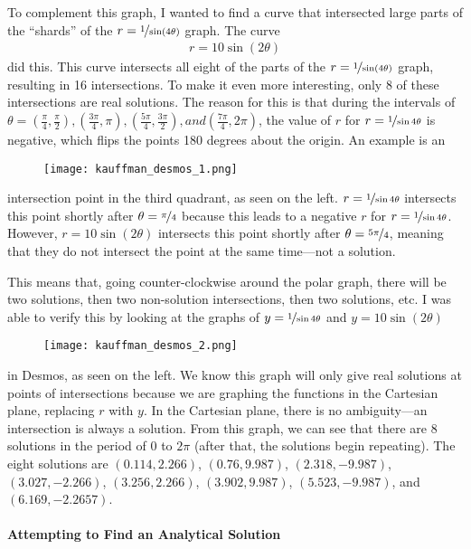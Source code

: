 To complement this graph, I wanted to find a curve that intersected large parts of the ``shards'' of the $r = \nicefrac{1}{\sin(4\theta)}$ graph. The curve
\begin{align*}
    r = 10\sin(2\theta)
\end{align*}
did this. This curve intersects all eight of the parts of the $r = \nicefrac{1}{\sin(4\theta)}$ graph, resulting in 16 intersections. To make it even more interesting, only 8 of these intersections are real solutions. The reason for this is that during the intervals of $\theta = (\frac{\pi}{4}, \frac{\pi}{2}), (\frac{3\pi}{4}, \pi), (\frac{5\pi}{4}, \frac{3\pi}{2}), and (\frac{7\pi}{4}, 2\pi)$, the value of $r$ for $r = \nicefrac{1}{\sin{4\theta}}$ is negative, which flips the points 180 degrees about the origin. An example is an \begin{wrapfigure}{l}{0.55\textwidth}
    \centering
    \texttt{[image: kauffman\_desmos\_1.png]}
\end{wrapfigure} intersection point in the third quadrant, as seen on the left. $r = \nicefrac{1}{\sin{4\theta}}$ intersects this point shortly after $\theta = \nicefrac{\pi}{4}$ because this leads to a negative $r$ for $r = \nicefrac{1}{\sin{4\theta}}$. However, $r = 10\sin(2\theta)$ intersects this point shortly after $\theta = \nicefrac{5\pi}{4}$, meaning that they do not intersect the point at the same time---not a solution.

This means that, going counter-clockwise around the polar graph, there will be two solutions, then two non-solution intersections, then two solutions, etc. I was able to verify this by looking at the graphs of $y = \nicefrac{1}{\sin{4\theta}}$ and $y = 10\sin(2\theta)$ \begin{wrapfigure}{l}{0.15\textwidth}
    \centering
    \texttt{[image: kauffman\_desmos\_2.png]}
\end{wrapfigure} in Desmos, as seen on the left. We know this graph will only give real solutions at points of intersections because we are graphing the functions in the Cartesian plane, replacing $r$ with $y$. In the Cartesian plane, there is no ambiguity---an intersection is always a solution. From this graph, we can see that there are 8 solutions in the period of $0$ to $2\pi$ (after that, the solutions begin repeating). The eight solutions are $(0.114, 2.266)$, $(0.76, 9.987)$, $(2.318, -9.987)$, $(3.027, -2.266)$, $(3.256, 2.266)$, $(3.902, 9.987)$, $(5.523, -9.987)$, and $(6.169, -2.2657)$.
\\\\
\noindent
\textbf{Attempting to Find an Analytical Solution}

